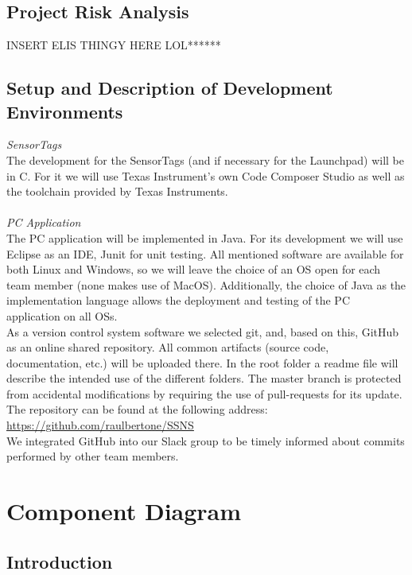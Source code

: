 \documentclass[conference,12pt]{IEEETran}
\begin{document}
\subsection{Project Risk Analysis}
INSERT ELIS THINGY HERE LOL******\\

\subsection{Setup and Description of Development Environments\\}
	\textit{SensorTags}
	\\The development for the SensorTags (and if necessary for the Launchpad) will be in C. For it we will use Texas Instrument’s own Code Composer Studio as well as the toolchain provided by Texas Instruments.\\
	\\\textit{PC Application}
	\\The PC application will be implemented in Java. For its development we will use Eclipse as an IDE, Junit for unit testing.
	All mentioned software are available for both Linux and Windows, so we will leave the choice of an OS open for each team member (none makes use of MacOS). Additionally, the choice of Java as the implementation language allows the deployment and testing of the PC application on all OSs.\\
	As a version control system software we selected git, and, based on this, GitHub as an online shared repository. All common artifacts (source code, documentation, etc.) will be uploaded there. In the root folder a readme file will describe the intended use of the different folders. The master branch is protected from accidental modifications by requiring the use of pull-requests for its update.\\
	The repository can be found at the following address:\\ \url{https://github.com/raulbertone/SSNS}
	\\We integrated GitHub into our Slack group to be timely informed about commits performed by other team members.
	
	
\section{Component Diagram}
\subsection{Introduction}
\end{document}
